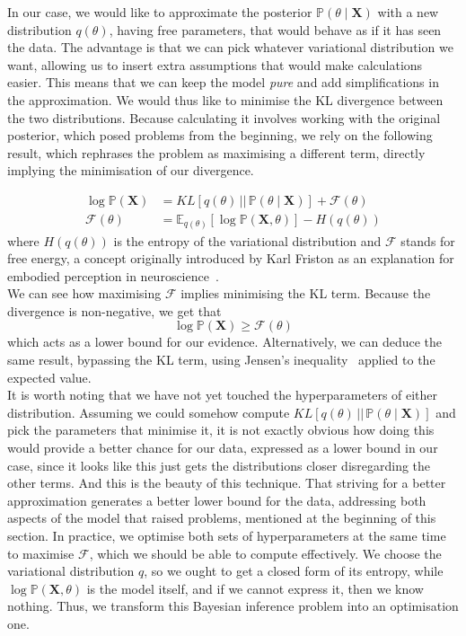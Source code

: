 \documentclass[12pt]{report}
\newcommand{\bs}{\boldsymbol}
\newcommand{\mc}[1]{\mathcal{#1}}
\newcommand{\E}{\mathbb{E}}
\renewcommand{\P}{\mathbb{P}}
\renewcommand{\bs}{\boldsymbol}
\begin{document}
\noindent
In our case, we would like to approximate the posterior $\P(\theta \mid \bs{X})$ with a new distribution $q(\theta)$, having free parameters, that would behave as if it has seen the data. The advantage is that we can pick whatever variational distribution we want, allowing us to insert extra assumptions that would make calculations easier. This means that we can keep the model \textit{pure} and add simplifications in the approximation. We would thus like to minimise the KL divergence between the two distributions. Because calculating it involves working with the original posterior, which posed problems from the beginning, we rely on the following result, which rephrases the problem as maximising a different term, directly implying the minimisation of our divergence.

\begin{align}
    \log\mathbb{P}(\textbf{X}) &= KL[q(\theta)\, ||\, \mathbb{P}(\theta \mid \textbf{X})] + \mc{F}(\theta) \\
    \mc{F}(\theta) &= \E_{q(\theta)}[\log\mathbb{P}(\textbf{X}, \theta)] - H(q(\theta)) \label{free_energy}
\end{align}
\noindent
where $H(q(\theta))$ is the entropy of the variational distribution and $\mc{F}$ stands for free energy, a concept originally introduced by Karl Friston as an explanation for embodied perception in neuroscience~\parencite{freeenergy}.\\

\noindent
We can see how maximising $\mc{F}$ implies minimising the KL term. Because the divergence is non-negative, we get that
\begin{equation}
    \log \P(\bs{X}) \geq \mc{F}(\theta)
\end{equation}
which acts as a lower bound for our evidence. Alternatively, we can deduce the same result, bypassing the KL term, using Jensen's inequality~\parencite{jensen} applied to the expected value.\\

\noindent
It is worth noting that we have not yet touched the hyperparameters of either distribution. Assuming we could somehow compute $KL[q(\theta)\, ||\, \P(\theta \mid \bs{X})]$ and pick the parameters that minimise it, it is not exactly obvious how doing this would provide a better chance for our data, expressed as a lower bound in our case, since it looks like this just gets the distributions closer disregarding the other terms. And this is the beauty of this technique. That striving for a better approximation generates a better lower bound for the data, addressing both aspects of the model that raised problems, mentioned at the beginning of this section. In practice, we optimise both sets of hyperparameters at the same time to maximise $\mc{F}$, which we should be able to compute effectively. We choose the variational distribution $q$, so we ought to get a closed form of its entropy, while $\log \P(\bs{X}, \theta)$ is the model itself, and if we cannot express it, then we know nothing. Thus, we transform this Bayesian inference problem into an optimisation one. \\
\end{document}
